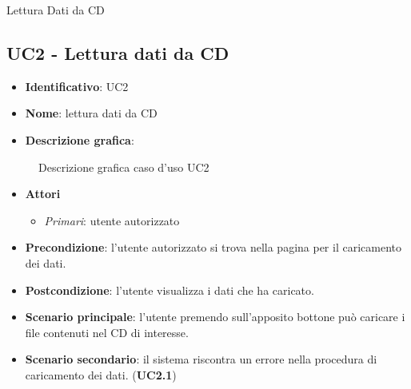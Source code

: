 \begin{usecase}{2}{Lettura Dati da CD}
  \label{uc:lettura-dati}
\end{usecase}
\subsection{UC2 - Lettura dati da CD}
\begin{itemize}
  \item \textbf{Identificativo}: UC2
  \item \textbf{Nome}: lettura dati da CD
  \item \textbf{Descrizione grafica}:
\end{itemize}

\begin{figure}[h]
  \centering
  \caption{Descrizione grafica caso d'uso UC2}
\end{figure}

\begin{itemize}
  \item \textbf{Attori}
        \begin{itemize}
          \item \textit{Primari}: utente autorizzato
        \end{itemize}
  \item \textbf{Precondizione}: l'utente autorizzato si trova nella pagina per il caricamento dei dati.
  \item \textbf{Postcondizione}: l'utente visualizza i dati che ha caricato.
  \item \textbf{Scenario principale}: l'utente premendo sull'apposito bottone può caricare i file contenuti nel CD di interesse.
  \item \textbf{Scenario secondario}: il sistema riscontra un errore nella procedura di caricamento dei dati. (\textbf{UC2.1})
\end{itemize}
\newpage

